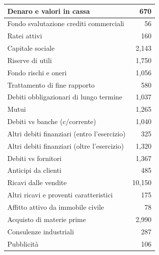 \documentclass{article}
\begin{document}
\begin{longtable}{|l|r|}
    Denaro e valori in cassa                               & 670                  \\
    \hline
    Fondo svalutazione crediti commerciali                 & 56                   \\
    \hline
    Ratei attivi                                           & 160                  \\
    \hline
    Capitale sociale                                       & 2,143                \\
    \hline
    Riserve di utili                                       & 1,750                \\
    \hline
    Fondo rischi e oneri                                   & 1,056                \\
    \hline
    Trattamento di fine rapporto                           & 580                  \\
    \hline
    Debiti obbligazionari di lungo termine                 & 1,037                \\
    \hline
    Mutui                                                  & 1,265                \\
    \hline
    Debiti vs banche (c/corrente)                          & 1,040                \\
    \hline
    Altri debiti finanziari (entro l’esercizio)            & 325                  \\
    \hline
    Altri debiti finanziari (oltre l’esercizio)            & 1,320                \\
    \hline
    Debiti vs fornitori                                    & 1,367                \\
    \hline
    Anticipi da clienti                                    & 485                  \\
    \hline
    Ricavi dalle vendite                                   & 10,150               \\
    \hline
    Altri ricavi e proventi caratteristici                 & 175                  \\
    \hline
    Affitto attivo da immobile civile                      & 78                   \\
    \hline
    Acquisto di materie prime                              & 2,990                \\
    \hline
    Consulenze industriali                                 & 287                  \\
    \hline
    Pubblicità                                             & 106                  \\

\end{longtable}
\end{document}
